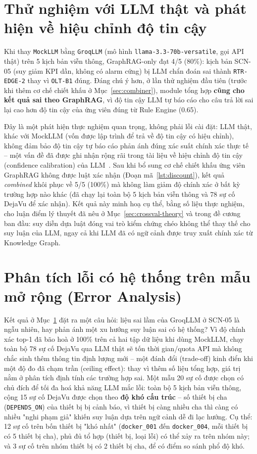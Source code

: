 \documentclass[12pt,a4paper]{report}
\newcommand{\code}[1]{\texttt{\small #1}}
\begin{document}
\section{Thử nghiệm với LLM thật và phát hiện về hiệu chỉnh độ tin cậy}
\label{sec:llm-thuc-nghiem}

Khi thay \code{MockLLM} bằng \code{GroqLLM} (mô hình \code{llama-3.3-70b-versatile}, gọi API thật)
trên 5 kịch bản viễn thông, GraphRAG-only đạt 4/5 (80\%): kịch bản SCN-05 (suy giảm KPI dần, không
có alarm cứng) bị LLM chẩn đoán sai thành \code{RTR-EDGE-2} thay vì \code{OLT-B1} đúng. Đáng chú ý
hơn, ở lần thử nghiệm đầu tiên (trước khi thêm cơ chế chiết khấu ở Mục~\ref{sec:combiner}), module
tổng hợp \textbf{cũng cho kết quả sai theo GraphRAG}, vì độ tin cậy LLM tự báo cáo cho câu trả lời
sai lại cao hơn độ tin cậy của ứng viên đúng từ Rule Engine (0.65).

Đây là một phát hiện thực nghiệm quan trọng, không phải lỗi cài đặt: LLM thật, khác với MockLLM
(vốn được lập trình để trả về độ tin cậy có hiệu chỉnh), không đảm bảo độ tin cậy tự báo cáo phản
ánh đúng xác suất chính xác thực tế -- một vấn đề đã được ghi nhận rộng rãi trong tài liệu về hiệu
chỉnh độ tin cậy (confidence calibration) của LLM~\cite{guo2017calibration}. Sau khi bổ sung cơ chế
chiết khấu ứng viên GraphRAG không được luật xác nhận (Đoạn mã~\ref{lst:discount}), kết quả
\emph{combined} khôi phục về 5/5 (100\%) mà không làm giảm độ chính xác ở bất kỳ trường hợp nào
khác (đã chạy lại toàn bộ 5 kịch bản viễn thông và 78 sự cố DejaVu để xác nhận). Kết quả này minh
hoạ cụ thể, bằng số liệu thực nghiệm, cho luận điểm lý thuyết đã nêu ở Mục~\ref{sec:crossval-theory}
và trong đề cương ban đầu: suy diễn dựa luật đóng vai trò kiểm chứng chéo không thể thay thế cho
suy luận của LLM, ngay cả khi LLM đã có ngữ cảnh được truy xuất chính xác từ Knowledge Graph.

\section{Phân tích lỗi có hệ thống trên mẫu mở rộng (Error Analysis)}
\label{sec:error-analysis}

Kết quả ở Mục~\ref{sec:llm-thuc-nghiem} đặt ra một câu hỏi: liệu sai lầm của GroqLLM ở SCN-05 là
ngẫu nhiên, hay phản ánh một xu hướng suy luận sai có hệ thống? Vì độ chính xác top-1 đã bão hoà ở
100\% trên cả hai tập dữ liệu khi dùng MockLLM, chạy toàn bộ 78 sự cố DejaVu qua LLM thật sẽ tốn
thời gian/quota API mà không chắc sinh thêm thông tin định lượng mới -- một đánh đổi (trade-off)
kinh điển khi một độ đo đã chạm trần (ceiling effect): thay vì thêm số liệu tổng hợp, giá trị nằm ở
phân tích định tính các trường hợp sai. Một mẫu 20 sự cố được chọn có chủ đích để tối đa hoá khả
năng LLM mắc lỗi: toàn bộ 5 kịch bản viễn thông, cộng 15 sự cố DejaVu được chọn theo \textbf{độ khó
cấu trúc} -- số thiết bị cha (\code{DEPENDS\_ON}) của thiết bị bị cảnh báo, vì thiết bị càng nhiều
cha thì càng có nhiều "nghi phạm giả" khiến suy luận dựa trên ngữ cảnh dễ đi lạc hướng. Cụ thể: 12
sự cố trên bốn thiết bị "khó nhất" (\code{docker\_001} đến \code{docker\_004}, mỗi thiết bị có 5
thiết bị cha), phủ đủ tổ hợp (thiết bị, loại lỗi) có thể xảy ra trên nhóm này; và 3 sự cố trên nhóm
thiết bị có 2 thiết bị cha, để có điểm so sánh phổ độ khó.
\end{document}
